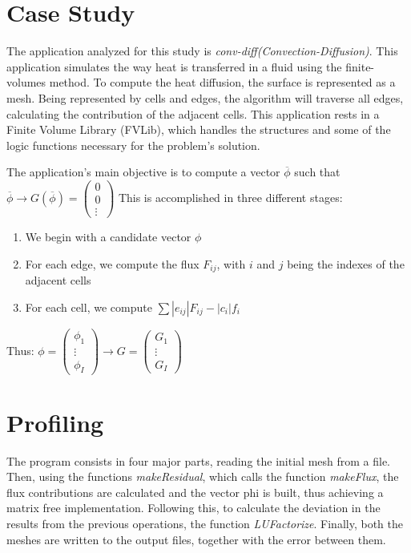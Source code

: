\documentclass[a4paper,10pt,openright,openbib,twocolumn]{article}
\begin{document}
\section{Case Study}    %

The application analyzed for this study is \emph{conv-diff(Convection-Diffusion)}. This application simulates the way heat is transferred in a fluid using the finite-volumes method. To compute the heat diffusion, the surface is represented as a mesh. Being represented by cells and edges, the algorithm will traverse all edges, calculating the contribution of the adjacent cells. This application rests in a Finite Volume Library (FVLib), which handles the structures and some of the logic functions necessary for the problem's solution. 

The application's main objective is to compute a vector $\overline{\phi}$ such that $\overline{\phi} \longrightarrow G(\overline{\phi}) = \left(\begin{array}{c}
0\\ 
0\\
\vdots\end{array}\right)$
This is accomplished in three different stages:
\begin{enumerate}
    \item {We begin with a candidate vector $\phi$} 
    \item {For each edge, we compute the flux $F_{ij}$, with $i$ and $j$ being the indexes of the adjacent cells}
    \item {For each cell, we compute $\sum |e_{ij}| F_{ij} - |c_i| f_i$}
\end{enumerate}
Thus: $\phi = \left(\begin{array}{c}
\phi_1\\
\vdots\\
\phi_I
\end{array}\right) \longrightarrow G = \left(\begin{array}{c}
G_1\\
\vdots\\
G_I
\end{array}\right)$

\section{Profiling}    %

The program consists in four major parts, reading the initial mesh from a file. Then, using the functions \emph{makeResidual}, which calls the function \emph{makeFlux}, the flux contributions are calculated and the vector phi is built, thus achieving a matrix free implementation. Following this, to calculate the deviation in the results from the previous operations, the function \emph{LUFactorize}. Finally, both the meshes are written to the output files, together with the error between them.
 
\end{document}
